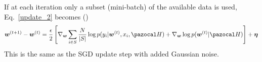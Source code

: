 If at each iteration only a subset (mini-batch) of the available data is used, Eq.~\eqref{update_2} becomes (\cite{welling2011bayesian})
\begin{equation}\label{update_3}
\bw^{(t+1)} - \bw^{(t)}= \frac{\epsilon}{2} \left[\nabla_{\bw} \sum_{i\in S}^{} \frac{N}{|S|}\log p(y_i|\bw^{(t)},x_i,\cH) + \nabla_{\bw}\log p(\bw^{(t)}|\cH)\right] + \boldsymbol{\eta}
\end{equation}
This is the same as the SGD update step with added Gaussian noise. 


\newpage	
\printbibliography[heading=bibintoc,title={References}]
	
